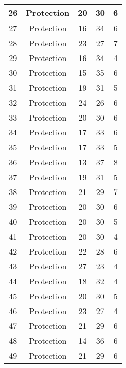 \documentclass[results.tex]{subfiles}
\begin{document}
\begin{center}
\begin{tabular}{| c || c | c | c | c |}
    \hline
    26 & Protection & 20 & 30 & 6 \\ 
    \hline
    27 & Protection & 16 & 34 & 6 \\ 
    \hline
    28 & Protection & 23 & 27 & 7 \\ 
    \hline
    29 & Protection & 16 & 34 & 4 \\ 
    \hline
    30 & Protection & 15 & 35 & 6 \\ 
    \hline
    31 & Protection & 19 & 31 & 5 \\ 
    \hline
    32 & Protection & 24 & 26 & 6 \\ 
    \hline
    33 & Protection & 20 & 30 & 6 \\ 
    \hline
    34 & Protection & 17 & 33 & 6 \\ 
    \hline
    35 & Protection & 17 & 33 & 5 \\ 
    \hline
    36 & Protection & 13 & 37 & 8 \\ 
    \hline
    37 & Protection & 19 & 31 & 5 \\ 
    \hline
    38 & Protection & 21 & 29 & 7 \\ 
    \hline
    39 & Protection & 20 & 30 & 6 \\ 
    \hline
    40 & Protection & 20 & 30 & 5 \\ 
    \hline
    41 & Protection & 20 & 30 & 4 \\ 
    \hline
    42 & Protection & 22 & 28 & 6 \\ 
    \hline
    43 & Protection & 27 & 23 & 4 \\ 
    \hline
    44 & Protection & 18 & 32 & 4 \\ 
    \hline
    45 & Protection & 20 & 30 & 5 \\ 
    \hline
    46 & Protection & 23 & 27 & 4 \\ 
    \hline
    47 & Protection & 21 & 29 & 6 \\ 
    \hline
    48 & Protection & 14 & 36 & 6 \\ 
    \hline
    49 & Protection & 21 & 29 & 6 \\ 
    \hline   \end{tabular}
\end{center}
\end{document}
